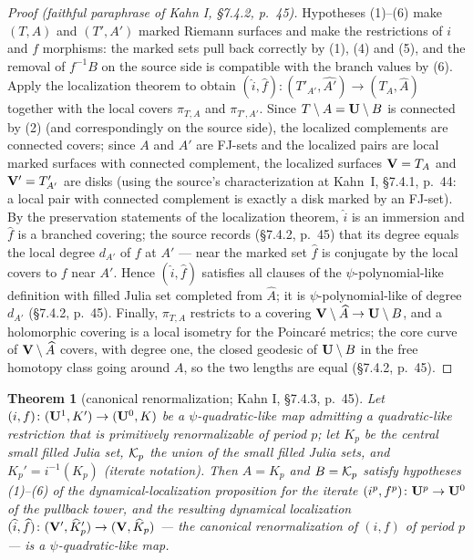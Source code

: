 \documentclass[11pt,reqno]{amsart}
\newtheorem{theorem}{Theorem}[section]
\theoremstyle{definition}
\theoremstyle{remark}
\begin{document}
\begin{proof}[Proof (faithful paraphrase of Kahn I, \S7.4.2, p.~45)]
Hypotheses (1)--(6) make \((T,A)\) and \((T',A')\) marked Riemann
surfaces and make the restrictions of \(i\) and \(f\) morphisms: the
marked sets pull back correctly by (1), (4) and (5), and the removal
of \(f^{-1}B\) on the source side is compatible with the branch values
by (6).  Apply the localization theorem to obtain
\((\widehat i,\widehat f)\colon(T'_{A'},\widehat{A'})\to(T_A,\widehat A)\)
together with the local covers \(\pi_{T,A}\) and \(\pi_{T',A'}\).
Since \(T\setminus A=\mathbf{U}\setminus B\) is connected by (2) (and correspondingly on
the source side), the localized complements are connected covers;
since \(A\) and \(A'\) are FJ-sets and the localized pairs are local
marked surfaces with connected complement, the localized surfaces
\(\mathbf{V}=T_A\) and \(\mathbf{V}'=T'_{A'}\) are disks (using the source's
characterization at Kahn~I, \S7.4.1, p.~44: a local pair with connected
complement is exactly a disk marked by an FJ-set).  By the
preservation statements of the localization theorem, \(\widehat i\) is
an immersion and \(\widehat f\) is a branched covering; the source
records (\S7.4.2, p.~45) that its degree equals the local degree
\(d_{A'}\) of \(f\) at \(A'\) --- near the marked set \(\widehat f\)
is conjugate by the local covers to \(f\) near \(A'\).  Hence
\((\widehat i,\widehat f)\) satisfies all clauses of the
\(\psi\)-polynomial-like definition with filled Julia set completed
from \(\widehat A\); it is \(\psi\)-polynomial-like of degree
\(d_{A'}\) (\S7.4.2, p.~45).  Finally, \(\pi_{T,A}\) restricts to a
covering \(\mathbf{V}\setminus\widehat A\to\mathbf{U}\setminus B\), and a holomorphic covering
is a local isometry for the Poincar\'e metrics; the core curve of
\(\mathbf{V}\setminus\widehat A\) covers, with degree one, the closed geodesic of
\(\mathbf{U}\setminus B\) in the free homotopy class going around \(A\), so the two
lengths are equal (\S7.4.2, p.~45).
\end{proof}
\begin{theorem}[canonical renormalization; Kahn I, \S7.4.3, p.~45]\label{thm:kahn-canonical-renormalization}
Let \((i,f)\colon(\mathbf{U}^1,K')\to(\mathbf{U}^0,K)\) be a \(\psi\)-quadratic-like
map admitting a quadratic-like restriction that is primitively
renormalizable of period \(p\); let \(K_p\) be the central small
filled Julia set, \(\mathcal{K}_p\) the union of the small filled Julia sets,
and \(K_p'=i^{-1}(K_p)\) (iterate notation).  Then \(A=K_p\) and
\(B=\mathcal{K}_p\) satisfy hypotheses (1)--(6) of the dynamical-localization
proposition for the iterate \((i^p,f^p)\colon\mathbf{U}^p\to\mathbf{U}^0\) of the
pullback tower, and the resulting dynamical localization
\((\widehat i,\widehat f)\colon(\mathbf{V}',\widehat K_p')\to(\mathbf{V},\widehat K_p)\)
--- the \emph{canonical renormalization of \((i,f)\) of period \(p\)}
--- is a \(\psi\)-quadratic-like map.
\end{theorem}
\end{document}
